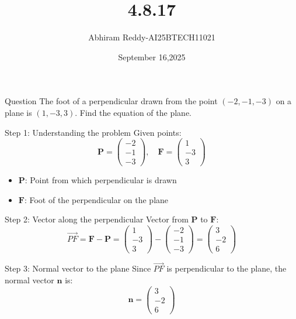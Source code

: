 \documentclass{beamer}
\title 
{4.8.17}
\date{September 16,2025}
\author 
{Abhiram Reddy-AI25BTECH11021}
\begin{document}
\frame{\titlepage}
\begin{frame}{Question}
    The foot of a perpendicular drawn from the point \((-2, -1, -3)\) on a plane is \((1, -3, 3)\). Find the equation of the plane.
\end{frame}

\begin{frame}{Step 1: Understanding the problem}
    Given points:
    \[
    \mathbf{P} = \begin{pmatrix} -2 \\ -1 \\ -3 \end{pmatrix}, \quad
    \mathbf{F} = \begin{pmatrix} 1 \\ -3 \\ 3 \end{pmatrix}
    \]
    \begin{itemize}
        \item \(\mathbf{P}\): Point from which perpendicular is drawn
        \item \(\mathbf{F}\): Foot of the perpendicular on the plane
    \end{itemize}
\end{frame}

\begin{frame}{Step 2: Vector along the perpendicular}
    Vector from \(\mathbf{P}\) to \(\mathbf{F}\):
    \[
    \vec{PF} = \mathbf{F} - \mathbf{P} = \begin{pmatrix} 1 \\ -3 \\ 3 \end{pmatrix} - \begin{pmatrix} -2 \\ -1 \\ -3 \end{pmatrix} = \begin{pmatrix} 3 \\ -2 \\ 6 \end{pmatrix}
    \]
\end{frame}

\begin{frame}{Step 3: Normal vector to the plane}
    Since \(\vec{PF}\) is perpendicular to the plane, the normal vector \(\mathbf{n}\) is:
    \[
    \mathbf{n} = \begin{pmatrix} 3 \\ -2 \\ 6 \end{pmatrix}
    \]
\end{frame}
\end{document}
